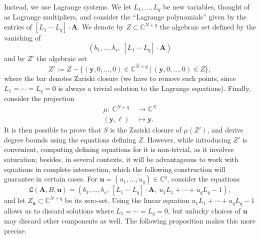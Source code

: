 \documentclass[12pt]{article}
\def\X{S}
\def\frkL{\mathfrak{L}}
\def\yb{{\bm y}}
\def\C{\mathbb{C}}
\begin{document}
Instead, we use Lagrange systems. We let $L_1,\hdots,L_q$ be new
variables, thought of as Lagrange multipliers, and consider the
``Lagrange polynomials'' given by the entries of $ [ L_1 ~\cdots~
  L_q]\cdot \bm A$. We denote by $Z \subset \C^{N+q}$ the algebraic set
defined by the vanishing of
\[ ( b_1,\dots,b_s, \  [ L_1 ~\cdots~ L_q]\cdot \bm A )\]
and by $Z'$ the algebraic set
\[
Z' := \overline{Z - \{(\yb,0,\dots,0) \in \C^{N+q}~|~(\yb,0,\dots,0) \in Z\}},
\]
where the bar denotes Zariski closure (we have to remove such points,
since $L_1=\cdots=L_q=0$ is always a trivial solution to the Lagrange
equations). Finally, consider the projection
\begin{align*} 
  \mu :~ \C^{N+q} &\rightarrow \C^{N}\\
  (\yb,\bm \ell)~ &\mapsto \yb.
\end{align*}
It is then possible to prove that $\X$ is the Zariski closure of
${\mu(Z')}$, and derive degree bounds using the equations defining
$Z$. However, while introducing $Z'$ is convenient, computing defining
equations for it is non-trivial, as it involves saturation; besides,
in several contexts, it will be advantageous to work with equations in
complete intersection, which the following construction will guarantee  in
certain cases. For $\bm u = (u_1,\dots,u_q) \in \C^q$, consider the
equations
\[\frkL(\bm A, B,\bm u) = ( b_1,\dots,b_s, \  [ L_1 ~\cdots~ L_q]\cdot \bm A,\ u_1 L_1 + \cdots + u_q L_q -1 ),\]
and let $Z_{\bm u} \subset \C^{N+q}$ be its zero-set. Using the linear
equation $u_1 L_1 + \cdots + u_q L_q -1$ allows us to discard
solutions where $L_1 = \cdots =L_q = 0$, but unlucky choices of $\bm
u$ may discard other components as well. The following proposition
makes this more precise.
\end{document}
